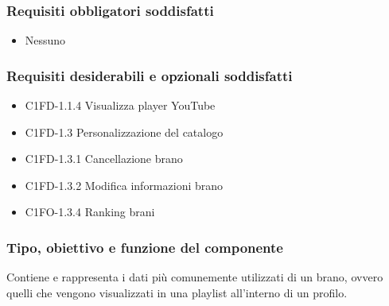 \subsubsection*{Requisiti obbligatori soddisfatti}
\begin{itemize}
    \item Nessuno
\end{itemize}
\subsubsection*{Requisiti desiderabili e opzionali soddisfatti}
\begin{itemize}
    \item C1FD-1.1.4 Visualizza player YouTube
    \item C1FD-1.3 Personalizzazione del catalogo
    \item C1FD-1.3.1 Cancellazione brano
    \item C1FD-1.3.2 Modifica informazioni brano
    \item C1FO-1.3.4 Ranking brani
\end{itemize}
\subsubsection*{Tipo, obiettivo e funzione del componente}
Contiene e rappresenta i dati pi\`u comunemente utilizzati di un brano, ovvero
quelli che vengono visualizzati in una playlist all'interno di un profilo.
